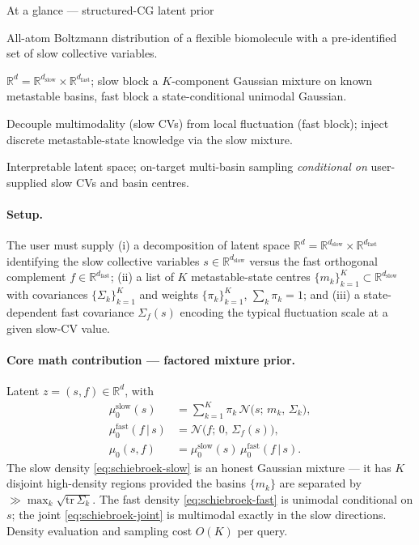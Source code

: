 \documentclass[11pt,letterpaper]{article}
\newcommand{\Real}{\mathbb{R}}
\theoremstyle{plain}
\begin{document}
\begin{methodbox}{At a glance --- structured-CG latent prior}
\begin{description}[leftmargin=2.2em,style=nextline,itemsep=0pt,topsep=2pt]
  \item[Target] All-atom Boltzmann distribution of a flexible biomolecule
    with a pre-identified set of slow collective variables.
  \item[Prior] $\Real^{d}=\Real^{d_{\mathrm{slow}}}\!\times\Real^{d_{\mathrm{fast}}}$;
    slow block a $K$-component Gaussian mixture on known metastable
    basins, fast block a state-conditional unimodal Gaussian.
  \item[New idea] Decouple multimodality (slow CVs) from local
    fluctuation (fast block); inject discrete metastable-state knowledge
    via the slow mixture.
  \item[Headline] Interpretable latent space; on-target multi-basin
    sampling \emph{conditional on} user-supplied slow CVs and basin
    centres.
\end{description}
\end{methodbox}

\paragraph{Setup.} The user must supply (i) a decomposition of latent
space
$\Real^d=\Real^{d_{\mathrm{slow}}}\times\Real^{d_{\mathrm{fast}}}$
identifying the slow collective variables
$s\in\Real^{d_{\mathrm{slow}}}$ versus the fast orthogonal complement
$f\in\Real^{d_{\mathrm{fast}}}$; (ii) a list of $K$ metastable-state
centres $\{m_k\}_{k=1}^K\subset\Real^{d_{\mathrm{slow}}}$ with covariances
$\{\Sigma_k\}_{k=1}^K$ and weights $\{\pi_k\}_{k=1}^K$, $\sum_k\pi_k=1$;
and (iii) a state-dependent fast covariance $\Sigma_f(s)$ encoding the
typical fluctuation scale at a given slow-CV value.

\paragraph{Core math contribution --- factored mixture prior.} Latent
$z=(s,f)\in\Real^d$, with
\begin{align}
  \mu_0^{\mathrm{slow}}(s) &= \sum_{k=1}^K \pi_k\,\mathcal N\!\big(s;\,m_k,\,\Sigma_k\big), \label{eq:schiebroek-slow}\\
  \mu_0^{\mathrm{fast}}(f\,|\,s) &= \mathcal N\!\big(f;\,0,\,\Sigma_f(s)\big), \label{eq:schiebroek-fast}\\
  \mu_0(s,f) &= \mu_0^{\mathrm{slow}}(s)\,\mu_0^{\mathrm{fast}}(f\,|\,s). \label{eq:schiebroek-joint}
\end{align}
The slow density \eqref{eq:schiebroek-slow} is an honest Gaussian mixture
--- it has $K$ disjoint high-density regions provided the basins
$\{m_k\}$ are separated by ${\gg}\max_k\sqrt{\mathrm{tr}\,\Sigma_k}$. The
fast density \eqref{eq:schiebroek-fast} is unimodal conditional on $s$;
the joint \eqref{eq:schiebroek-joint} is multimodal exactly in the slow
directions. Density evaluation and sampling cost $O(K)$ per query.
\end{document}

